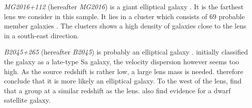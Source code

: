 \documentclass[useAMS,usenatbib]{mn2e}
\begin{document}



\textit{MG2016+112} (hereafter \textit{MG2016}) is a giant elliptical galaxy \citep{1984Sci...223...46L,1986AJ.....91..991S}. It is the farthest lens we consider in this sample. It lies in a cluster which consists of 69 probable member galaxies \citep{2003MNRAS.344..337T}. The clusters shows a high density of galaxies close to the lens in a south-east direction.

\textit{B2045+265} (hereafter \textit{B2045}) is probably an elliptical galaxy \citep{2007MNRAS.378..109M}. \cite{1999AJ....117..658F} initially classified the galaxy as a late-type Sa galaxy, the velocity dispersion however seems too high. As the source redshift is rather low, a large lens mass is needed. \cite{2007MNRAS.378..109M} therefore conclude that it is more likely an elliptical galaxy. To the west of the lens, \cite{1999AJ....117..658F} find that a group at a similar redshift as the lens. \cite{2007MNRAS.378..109M} also find evidence for a dwarf satellite galaxy.
\end{document}
